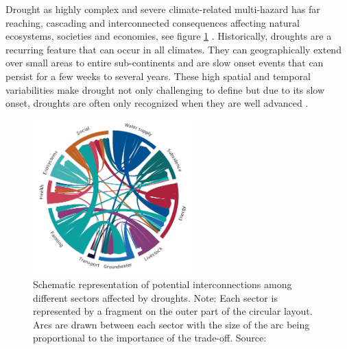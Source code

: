 Drought as highly complex and severe climate-related multi-hazard has far reaching, cascading and interconnected consequences affecting natural ecosystems, societies and economies, see figure \ref{fig:th_drought} \autocite{undrrSpecialReportDrought2021}. Historically, droughts are a recurring feature that can occur in all climates. They can geographically extend over small areas to entire sub-continents and are slow onset events that can persist for a few weeks to several years. These high spatial and temporal variabilities make drought not only challenging to define but due to its slow onset, droughts are often only recognized when they are well advanced \autocite{idmpDroughtWaterScarcity2022,undrrSpecialReportDrought2021}.
\begin{figure}[]
    \centering
    \includegraphics[width=0.55\textwidth]{figures/2023_MA_th_drought_interconnections.pdf}
    \decoRule
    \caption[Interconnectedness of Drought Impacts]{Schematic representation of potential interconnections among different sectors affected by droughts. {\footnotesize Note: Each sector is represented by a fragment on the outer part of the circular layout. Arcs are drawn between each sector with the size of the arc being proportional to the importance of the trade-off}. Source: \textcite[47]{undrrSpecialReportDrought2021}}
    \label{fig:th_drought}
\end{figure}

